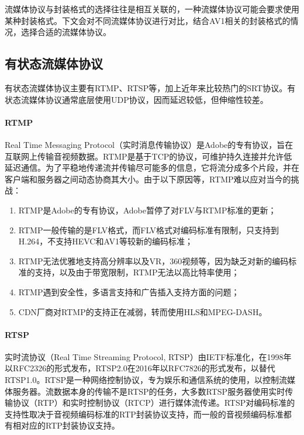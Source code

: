 流媒体协议与封装格式的选择往往是相互关联的，一种流媒体协议可能会要求使用某种封装格式。下文会对不同流媒体协议进行对比，结合AV1相关的封装格式的情况，选择合适的流媒体协议。

\subsection{有状态流媒体协议}

有状态流媒体协议主要有RTMP、RTSP等，加上近年来比较热门的SRT协议。有状态流媒体协议通常底层使用UDP协议，因而延迟较低，但伸缩性较差。

\paragraph{RTMP} Real Time Messaging Protocol（实时消息传输协议）是Adobe的专有协议，旨在互联网上传输音视频数据。RTMP是基于TCP的协议，可维护持久连接并允许低延迟通信。为了平稳地传递流并传输尽可能多的信息，它将流分成多个片段，并在客户端和服务器之间动态协商其大小。由于以下原因等，RTMP难以应对当今的挑战：

\begin{enumerate} [label=\arabic*)]
    \item RTMP是Adobe的专有协议，Adobe暂停了对FLV与RTMP标准的更新；
    \item RTMP一般传输的是FLV格式，而FLV格式对编码标准有限制，只支持到H.264，不支持HEVC和AV1等较新的编码标准；
    \item RTMP无法优雅地支持高分辨率以及VR，360视频等，因为缺乏对新的编码标准的支持，以及由于带宽限制，RTMP无法以高比特率使用；
    \item RTMP遇到安全性，多语言支持和广告插入支持方面的问题；
    \item CDN厂商对RTMP的支持正在减弱，转而使用HLS和MPEG-DASH。
\end{enumerate}

\paragraph{RTSP} 实时流协议（Real Time Streaming Protocol, RTSP）由IETF标准化，在1998年以RFC2326\cite{schulzrinneRealTimeStreaming1998}的形式发布，RTSP2.0在2016年以RFC7826\cite{schulzrinneRealTimeStreamingProtocol2016}的形式发布，以替代RTSP1.0。RTSP是一种网络控制协议，专为娱乐和通信系统的使用，以控制流媒体服务器。流数据本身的传输不是RTSP的任务，大多数RTSP服务器使用实时传输协议（RTP\cite{schulzrinneRTPTransportProtocol2003}）和实时控制协议（RTCP）进行媒体流传递。RTSP对编码标准的支持性取决于音视频编码标准的RTP封装协议支持，而一般的音视频编码标准都有相对应的RTP封装协议支持。


